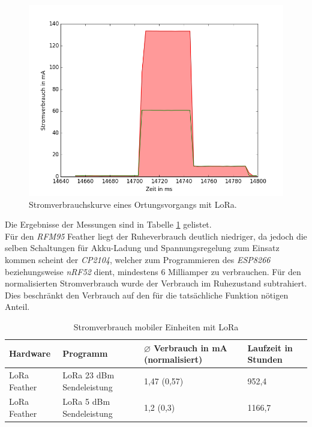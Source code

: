 \begin{figure}[h!]
  \centering
	\includegraphics[width=\textwidth]{plots/lora235send.png}
  \caption{Stromverbrauchskurve eines Ortungsvorgangs mit LoRa.}
  \label{fig:lora235send}
\end{figure}

Die Ergebnisse der Messungen sind in Tabelle \ref{table:lora235ina} gelistet.\\
Für den \emph{RFM95} Feather liegt der Ruheverbrauch deutlich niedriger, da jedoch die selben Schaltungen für Akku-Ladung und Spannungsregelung zum Einsatz kommen scheint der \emph{CP2104}, welcher zum Programmieren des \emph{ESP8266} beziehungsweise \emph{nRF52} dient, mindestens 6 Milliamper zu verbrauchen.
Für den normalisierten Stromverbrauch wurde der Verbrauch im Ruhezustand subtrahiert. 
Dies beschränkt den Verbrauch auf den für die tatsächliche Funktion nötigen Anteil.

\begin{table}[h!]
	\centering
	\caption{Stromverbrauch mobiler Einheiten mit LoRa}
	\label{table:lora235ina}
	\begin{tabular}{l|l|p{2.5cm}|p{2cm}}
		Hardware & Programm & $\varnothing$ Verbrauch in mA (normalisiert) & Laufzeit in Stunden\\
		\hline
		LoRa Feather & LoRa 23 dBm Sendeleistung & 1,47 (0,57) & 952,4\\
		LoRa Feather & LoRa 5 dBm Sendeleistung & 1,2 (0,3) & 1166,7\\
	\end{tabular}
\end{table}

